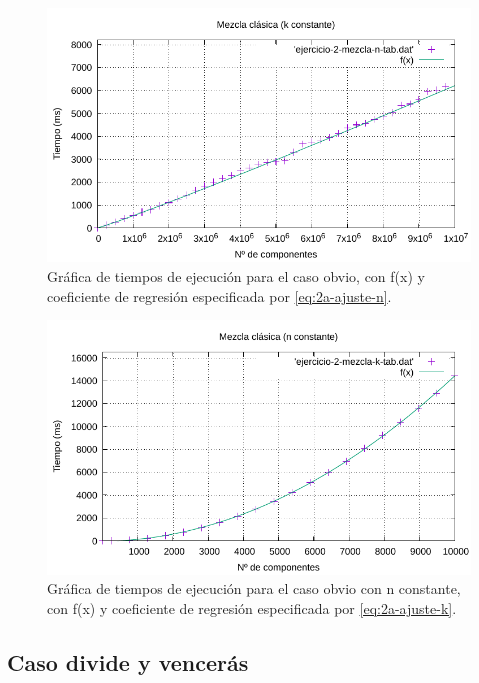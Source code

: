 \begin{figure}[h]
    \centering
    \includegraphics[scale=0.76]{img/e2a-graph.pdf}
    \caption{Gráfica de tiempos de ejecución para el caso obvio, 
    con f(x) y coeficiente de regresión especificada por \ref{eq:2a-ajuste-n}.}
    \label{fig:2a-obvio-n-graph}
\end{figure}

\begin{figure}[h]
	\centering
	\includegraphics[scale=0.76]{img/e2-obvio-k.pdf}
	\caption{Gráfica de tiempos de ejecución para el caso obvio con n constante, 
		con f(x) y coeficiente de regresión especificada por \ref{eq:2a-ajuste-k}.}
	\label{fig:2a-obvio-k-graph}
\end{figure}

\newpage

\subsection{Caso divide y vencerás}

